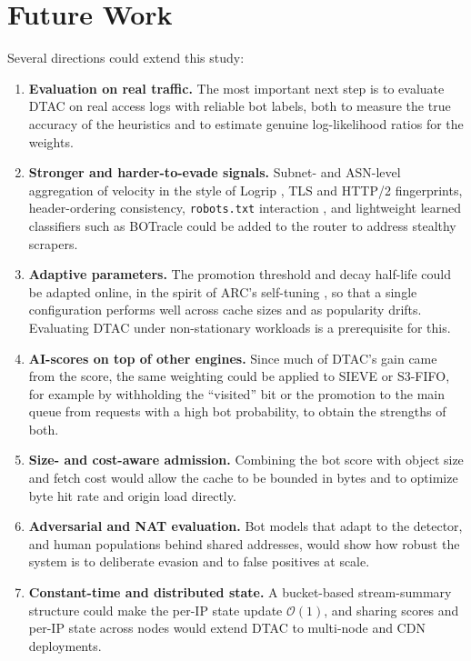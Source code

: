 \section{Future Work}
Several directions could extend this study:
\begin{enumerate}
    \item \textbf{Evaluation on real traffic.} The most important next step is to evaluate DTAC on real access logs with reliable bot labels, both to measure the true accuracy of the heuristics and to estimate genuine log-likelihood ratios for the weights.
    \item \textbf{Stronger and harder-to-evade signals.} Subnet- and ASN-level aggregation of velocity in the style of Logrip \cite{hoetzlein_protecting_2025}, TLS and HTTP/2 fingerprints, header-ordering consistency, \texttt{robots.txt} interaction \cite{martinez_llamas_balancing_2025}, and lightweight learned classifiers such as BOTracle \cite{kadel_botracle_2025} could be added to the router to address stealthy scrapers.
    \item \textbf{Adaptive parameters.} The promotion threshold and decay half-life could be adapted online, in the spirit of ARC's self-tuning \cite{vysotska_towards_2025}, so that a single configuration performs well across cache sizes and as popularity drifts. Evaluating DTAC under non-stationary workloads is a prerequisite for this.
    \item \textbf{AI-scores on top of other engines.} Since much of DTAC's gain came from the score, the same weighting could be applied to SIEVE or S3-FIFO, for example by withholding the ``visited'' bit or the promotion to the main queue from requests with a high bot probability, to obtain the strengths of both.
    \item \textbf{Size- and cost-aware admission.} Combining the bot score with object size and fetch cost \cite{neglia_access-time-aware_2017} would allow the cache to be bounded in bytes and to optimize byte hit rate and origin load directly.
    \item \textbf{Adversarial and NAT evaluation.} Bot models that adapt to the detector, and human populations behind shared addresses, would show how robust the system is to deliberate evasion and to false positives at scale.
    \item \textbf{Constant-time and distributed state.} A bucket-based stream-summary structure could make the per-IP state update $\mathcal{O}(1)$, and sharing scores and per-IP state across nodes would extend DTAC to multi-node and CDN deployments.
\end{enumerate}

